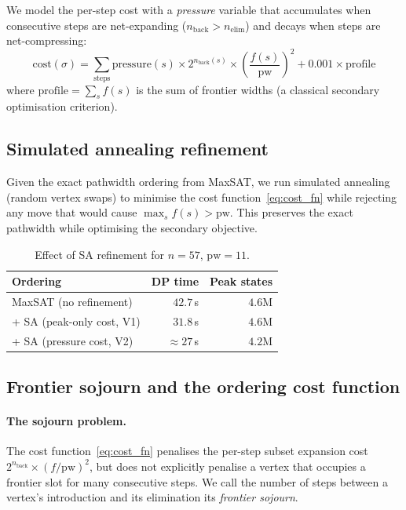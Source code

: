 \documentclass[12pt]{article}
\theoremstyle{definition}
\newcommand{\pw}{\mathrm{pw}}
\newcommand{\nb}{n_{\mathrm{back}}}
\begin{document}
We model the per-step cost with a \emph{pressure} variable that accumulates
when consecutive steps are net-expanding ($\nb > n_{\mathrm{elim}}$) and decays
when steps are net-compressing:
\begin{equation}
  \text{cost}(\sigma) = \sum_{\text{steps}} \mathrm{pressure}(s) \times 2^{\nb(s)}
    \times \left(\frac{f(s)}{\pw}\right)^2 + 0.001 \times \text{profile}
  \label{eq:cost_fn}
\end{equation}
where $\text{profile} = \sum_s f(s)$ is the sum of frontier widths (a
classical secondary optimisation criterion).

\subsection{Simulated annealing refinement}
\label{sec:sa}

Given the exact pathwidth ordering from MaxSAT, we run simulated annealing
(random vertex swaps) to minimise the cost function~\eqref{eq:cost_fn} while
rejecting any move that would cause $\max_s f(s) > \pw$.
This preserves the exact pathwidth while optimising the secondary objective.

\begin{table}[H]
\centering
\caption{Effect of SA refinement for $n = 57$, $\pw = 11$.}
\begin{tabular}{lrr}
\toprule
Ordering & DP time & Peak states\\
\midrule
MaxSAT (no refinement) & $42.7$\,s & $4.6$M\\
+ SA (peak-only cost, V1) & $31.8$\,s & $4.6$M\\
+ SA (pressure cost, V2) & $\approx 27$\,s & $4.2$M\\
\bottomrule
\end{tabular}
\end{table}

\subsection{Frontier sojourn and the ordering cost function}
\label{sec:sojourn}

\paragraph{The sojourn problem.}
The cost function~\eqref{eq:cost_fn} penalises the per-step subset
expansion cost $2^{\nb} \times (f/\pw)^2$, but does not explicitly
penalise a vertex that occupies a frontier slot for many consecutive
steps.  We call the number of steps between a vertex's introduction
and its elimination its \emph{frontier sojourn}.
\end{document}
